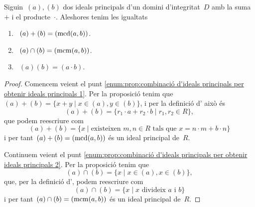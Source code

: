 \documentclass[../../main.tex]{subfiles}
\begin{document}
    \begin{proposition}
        \label{prop:combinació d'ideals principals per obtenir ideals principals}
        Siguin~\((a),(b)\) dos ideals principals d'un domini d'integritat~\(D\) amb la suma~\(+\) i el producte~\(\cdot\).
        Aleshores tenim les igualtats
        \begin{enumerate}
            \item\label{enum:prop:combinació d'ideals principals per obtenir ideals principals 1}~\((a)+(b)=(\operatorname{mcd}(a,b))\).
            \item\label{enum:prop:combinació d'ideals principals per obtenir ideals principals 2}~\((a)\cap(b)=(\operatorname{mcm}(a,b))\).
            \item\label{enum:prop:combinació d'ideals principals per obtenir ideals principals 3}~\((a)(b)=(a\cdot b)\).
        \end{enumerate}
        \begin{proof}%
            Comencem veient el punt \eqref{enum:prop:combinació d'ideals principals per obtenir ideals principals 1}.
            Per la proposició  tenim que~\((a)+(b)=\{x+y\mid x\in(a),y\in(b)\}\), i per la definició d' això és
            \[
                (a)+(b)=\{r_{1}\cdot a+r_{2}\cdot b\mid r_{1},r_{2}\in R\},
            \]
            que podem reescriure com
            \[
                (a)+(b)=\{x\mid\text{existeixen }m,n\in R\text{ tals que }x=n\cdot m+b\cdot n\}
            \]
            i per tant~\((a)+(b)=(\operatorname{mcd}(a,b))\) és un ideal principal de~\(R\).

            Continuem veient el punt \eqref{enum:prop:combinació d'ideals principals per obtenir ideals principals 2}.
            Per la proposició  tenim que
            \[
                (a)\cap(b)=\{x\mid x\in(a),x\in(b)\},
            \]
            que, per la definició d', podem reescriure com
            \[
                (a)\cap(b)=\{x\mid x\text{ divideix }a\text{ i }b\}
            \]
            i per tant~\((a)\cap(b)=(\operatorname{mcm}(a,b))\) és un ideal principal de~\(R\).


\end{proof}
\end{proposition}
\end{document}
